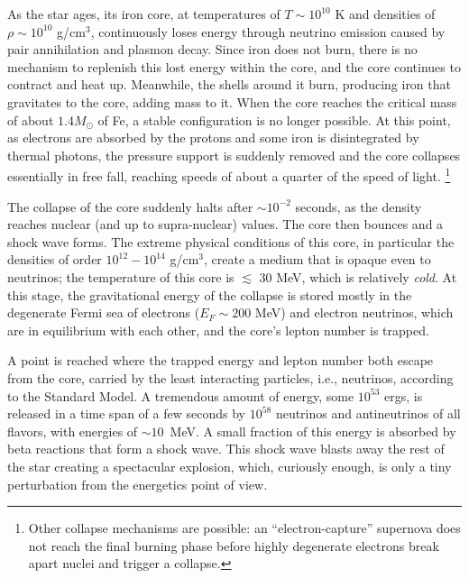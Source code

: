 As the star ages, its iron core, at temperatures of $T\sim 10^{10}$ K and densities of $\rho \sim 10^{10}$ g/cm$^{3}$, continuously loses energy through neutrino emission caused by pair annihilation and plasmon decay. Since iron does not burn, there is no mechanism to replenish this lost energy within the core, and the core continues to contract and heat up. Meanwhile, the shells around it burn, producing iron that gravitates to the core, adding mass to it.  When the core reaches the critical mass of about $1.4 M_{\odot}$ of Fe, a stable configuration is no longer possible. At this point, as electrons are absorbed by the protons and some iron is disintegrated by thermal photons, the pressure support is suddenly removed and the core collapses essentially in free fall, reaching speeds of about a quarter of the speed of light. 
\footnote{Other collapse mechanisms are possible: an ``electron-capture'' supernova does not reach the final burning phase before highly degenerate electrons break apart nuclei and trigger a collapse.}


The collapse of the core suddenly halts after $\sim 10^{-2}$ seconds, as the density reaches nuclear (and up to supra-nuclear)  values. The core then bounces and a shock wave forms. The extreme physical conditions of this core, in particular the densities of order $10^{12}-10^{14}$ g/cm$^{3}$, create a medium that is opaque even to neutrinos; %
the temperature of this core is %
$\lesssim$ 30 MeV, which is relatively \emph{cold}. At this stage, the gravitational energy of the collapse is stored mostly in the degenerate Fermi sea of electrons ($E_{F}\sim 200$ MeV) and electron neutrinos, which are in equilibrium with each other, and the core's lepton number is trapped.

A point is reached where the trapped energy and lepton number both escape 
from the core, carried by the least interacting particles, i.e., neutrinos, according to the Standard Model.  A tremendous amount of energy, some $10^{53}$ ergs, is released in a time span of a few seconds by $10^{58}$ neutrinos and antineutrinos of all flavors, with energies of $\sim 10$~MeV. 
A small fraction of this energy is absorbed by beta reactions that form a shock wave. This shock wave blasts away the rest of the star creating a spectacular explosion, which, curiously enough, is only a tiny perturbation from the energetics point of view. 

